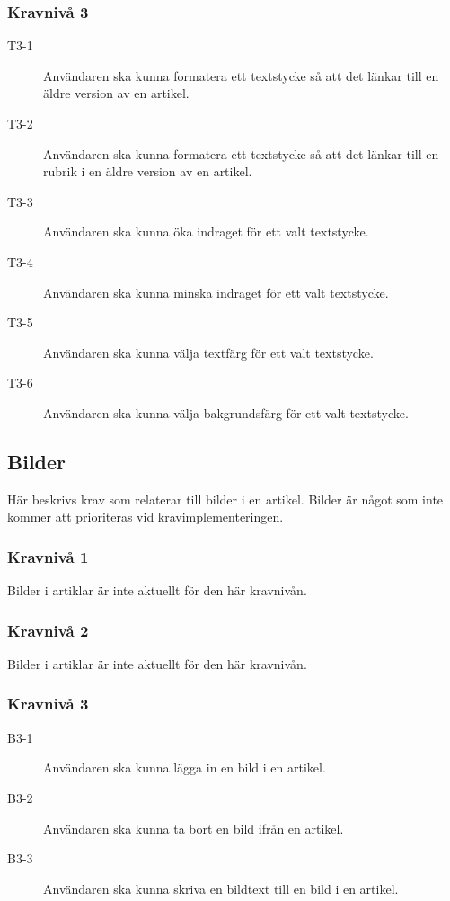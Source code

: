 \subsubsection{Kravnivå 3}
\begin{description}
\item[T3-1] Användaren ska kunna formatera ett textstycke så att det länkar till en äldre version av en artikel.
\item[T3-2] Användaren ska kunna formatera ett textstycke så att det länkar till en rubrik i en äldre version av en artikel.
\item[T3-3] Användaren ska kunna öka indraget för ett valt textstycke.
\item[T3-4] Användaren ska kunna minska indraget för ett valt textstycke.
\item[T3-5] Användaren ska kunna välja textfärg för ett valt textstycke.
\item[T3-6] Användaren ska kunna välja bakgrundsfärg för ett valt textstycke.
\end{description}

\subsection{Bilder}
Här beskrivs krav som relaterar till bilder i en artikel. Bilder är något som inte kommer att prioriteras vid kravimplementeringen.

\subsubsection{Kravnivå 1}
Bilder i artiklar är inte aktuellt för den här kravnivån.

\subsubsection{Kravnivå 2}
Bilder i artiklar är inte aktuellt för den här kravnivån.

\subsubsection{Kravnivå 3}
\begin{description}
\item[B3-1] Användaren ska kunna lägga in en bild i en artikel.
\item[B3-2] Användaren ska kunna ta bort en bild ifrån en artikel.
\item[B3-3] Användaren ska kunna skriva en bildtext till en bild i en artikel.
\end{description}

